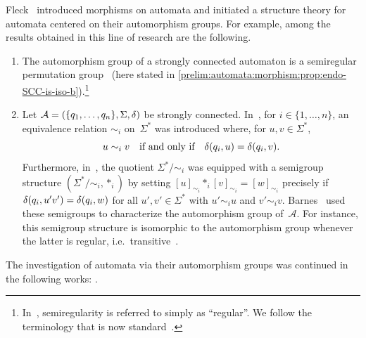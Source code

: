 Fleck~\cite{Fleck61,DBLP:journals/jacm/Fleck62} introduced morphisms on automata
and initiated a structure theory for automata centered on their automorphism groups.
For example, among the results obtained in this line of research are the following.
\begin{enumerate}
	\item The automorphism group of a strongly connected automaton
	is a semiregular permutation group~\cite{DBLP:journals/jacm/Fleck62,DBLP:journals/jacm/Weeg62}
	(here stated in \cref{prelim:automata:morphism:prop:endo-SCC-is-iso-b}).\footnote{%
		In~\cite{DBLP:journals/jacm/Fleck62,DBLP:journals/jacm/Weeg62}, semiregularity is referred to simply as ``regular''.
		We follow the terminology that is now standard~\cite{cameron_1999,dixon1996permutation,wielandt1964finite}.}
	\item Let $\mathcal A = (\{q_1, \ldots, q_n\}, \Sigma, \delta)$ be strongly connected.
	In~\cite{DBLP:journals/jacm/Weeg62}, for $i \in \{1,\ldots,n\}$,
	an equivalence relation $\sim_i$ on~$\Sigma^*$ was introduced
	where, for $u,v \in \Sigma^*$,
	\[
	u \sim_i v \quad\text{if and only if}\quad \delta(q_i,u) = \delta(q_i,v).
	\]
	Furthermore, in~\cite[Def.~5]{DBLP:journals/jacm/Weeg62},
	the quotient $\Sigma^* / {\sim_i}$ was equipped with a semigroup structure $(\Sigma^* / {\sim_i}, \ast_i)$
	by setting $[u]_{\sim_i} \ast_i [v]_{\sim_i} = [w]_{\sim_i}$
	precisely if $\delta(q_i,u'v') = \delta(q_i,w)$
	for all $u', v' \in \Sigma^*$ with $u' \sim_i u$ and $v' \sim_i v$.
	Barnes~\cite{DBLP:journals/jacm/Barnes65,DBLP:journals/mst/Barnes70}
	used these semigroups to characterize the automorphism group of~$\mathcal A$.
	For instance, this semigroup structure is isomorphic to the automorphism group
	whenever the latter is regular, i.e.\ transitive~\cite[Cor.~1 and Thms.~3 \&~4]{DBLP:journals/jacm/Barnes65}.
\end{enumerate}
The investigation of automata via their automorphism groups was continued in the following works:
\cite{
	DBLP:journals/jacm/Barnes65,
	DBLP:journals/mst/Barnes70,
	DBLP:journals/jacm/Bavel68,
	DBLP:journals/cacm/Bavel70,
	DBLP:journals/jacm/Fleck62,
	DBLP:journals/jacm/Fleck65,
	DBLP:journals/mst/Grzymala-Busse70,
	DBLP:journals/jcss/Grzymala-Busse71,
	DBLP:conf/mfcs/Grzymala-Busse75,
	DBLP:journals/jcss/MasunagaNO73,
	DBLP:journals/jacm/Oehmke63,
	DBLP:journals/jacm/Weeg65,
	DBLP:journals/jacm/Weeg67,
}.

